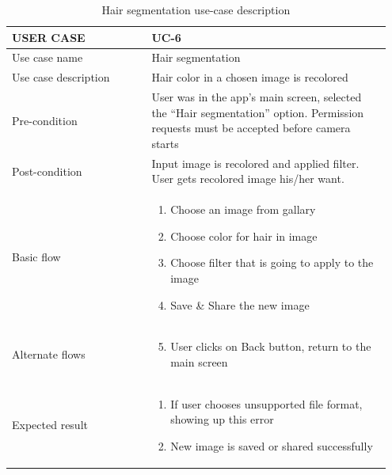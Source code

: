 \begin{center}
\begin{table} [H]
\caption{Hair segmentation use-case description} 
\begin{tabular}{p{0.35\linewidth} | p{0.6\linewidth}}
\hline
USER CASE            & UC-6 \\ \hline
Use case name        &  Hair segmentation  \\ \hline
Use case description &  Hair color in a chosen image is recolored    \\\hline
Pre-condition         &   User was in the app’s main screen, selected the “Hair segmentation” option. Permission requests must be accepted before camera starts   \\ \hline
Post-condition        &   Input image is recolored and applied filter. User gets recolored image his/her want.   \\ \hline
Basic flow           &   \begin{enumerate}
    \item Choose an image from gallary
    \item Choose color for hair in image
    \item Choose filter that is going to apply to the image
    \item Save \& Share the new image
\end{enumerate}
   \\ \hline
Alternate flows      &    \begin{enumerate}
    \setcounter{enumi}{4}
    \item User clicks on Back button, return to the main screen
\end{enumerate}  \\ \hline
Expected result      &  \begin{enumerate}
    \item 	If user chooses unsupported file format, showing up this error
    \item 	New image is saved or shared successfully
\end{enumerate}    \\ \hline
\end{tabular}
\end{table}
\end{center}

